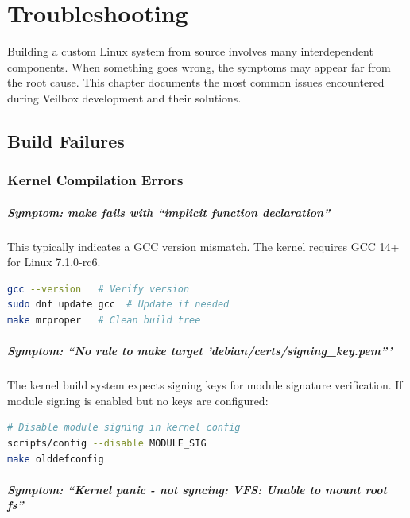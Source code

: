 \chapter{Troubleshooting}
\label{ch:trouble}

Building a custom Linux system from source involves many interdependent
components. When something goes wrong, the symptoms may appear far from
the root cause. This chapter documents the most common issues encountered
during Veilbox development and their solutions.

\section{Build Failures}

\subsection{Kernel Compilation Errors}

\paragraph{Symptom: make fails with ``implicit function declaration''}

This typically indicates a GCC version mismatch. The kernel requires GCC
14+ for Linux 7.1.0-rc6.

\begin{lstlisting}[language=bash]
gcc --version   # Verify version
sudo dnf update gcc  # Update if needed
make mrproper   # Clean build tree
\end{lstlisting}

\paragraph{Symptom: ``No rule to make target 'debian/certs/signing\_key.pem'''}

The kernel build system expects signing keys for module signature
verification. If module signing is enabled but no keys are configured:

\begin{lstlisting}[language=bash]
# Disable module signing in kernel config
scripts/config --disable MODULE_SIG
make olddefconfig
\end{lstlisting}

\paragraph{Symptom: ``Kernel panic - not syncing: VFS: Unable to mount root fs''}


